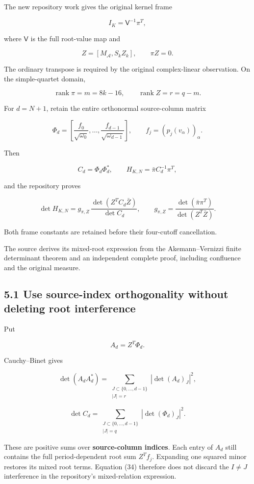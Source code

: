 The new repository work gives the original kernel frame

\[
I_K=\mathsf V^{-1}\pi^T,
\]

where \(\mathsf V\) is the full root-value map and

\[
Z=[M_{\mathcal A},S_kZ_k],\qquad \pi Z=0.
\]

The ordinary transpose is required by the original complex-linear observation. On the simple-quartet domain,

\[
\operatorname{rank}\pi=m=8k-16,\qquad
\operatorname{rank}Z=r=q-m.
\]

For \(d=N+1\), retain the entire orthonormal source-column matrix

\[
\Phi_d=
\left[
\frac{f_0}{\sqrt{\omega_0}},\ldots,
\frac{f_{d-1}}{\sqrt{\omega_{d-1}}}
\right],
\qquad
f_j=(p_j(v_\alpha))_\alpha.
\]

Then

\[
C_d=\Phi_d\Phi_d^*,
\qquad
H_{K,N}=\bar\pi C_d^{-1}\pi^T,
\]

and the repository proves

\[
\boxed{
\det H_{K,N}
=
g_{\pi,Z}\,
\frac{\det(Z^TC_d\bar Z)}{\det C_d},
\qquad
g_{\pi,Z}
=
\frac{\det(\bar\pi\pi^T)}{\det(Z^T\bar Z)}.
}
\tag{33}
\]

Both frame constants are retained before their four-cutoff cancellation.

The source derives its mixed-root expression from the Akemann--Vernizzi finite determinant theorem and an independent complete proof, including confluence and the original measure.

\subsection{5.1 Use source-index orthogonality without deleting root interference}\label{use-source-index-orthogonality-without-deleting-root-interference}

Put

\[
A_d=Z^T\Phi_d.
\]

Cauchy--Binet gives

\[
\boxed{
\det(A_dA_d^*)
=
\sum_{\substack{J\subset\{0,\ldots,d-1\}\\|J|=r}}
|\det(A_d)_J|^2,
}
\]

\[
\boxed{
\det C_d
=
\sum_{\substack{J\subset\{0,\ldots,d-1\}\\|J|=q}}
|\det(\Phi_d)_J|^2.
}
\tag{34}
\]

These are positive sums over \textbf{source-column indices}. Each entry of \(A_d\) still contains the full period-dependent root sum \(Z^Tf_j\). Expanding one squared minor restores its mixed root terms. Equation (34) therefore does not discard the \(I\ne J\) interference in the repository's mixed-relation expression.

